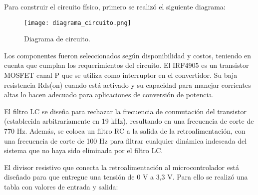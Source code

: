 Para construir el circuito físico, primero se realizó el siguiente diagrama:

\begin{figure}[H]
    \centering
    \texttt{[image: diagrama\_circuito.png]}
    \vspace{-0.25cm}
    \caption{Diagrama de circuito.}
    \label{fig:diagrama_circuito}
\end{figure}
\vspace{-0.5cm}

Los componentes fueron seleccionados según disponibilidad y costos, teniendo en cuenta que cumplan los requerimientos del circuito.
El IRF4905 es un transistor MOSFET canal P que se utiliza como interruptor en el convertidor. Su baja resistencia Rds(on) cuando está activado y 
su capacidad para manejar corrientes altas lo hacen adecuado para aplicaciones de conversión de potencia.

El filtro LC se diseña para rechazar la frecuencia de conmutación del transistor (establecida arbitrariamente en 19 kHz),
resultando en una frecuencia de corte de 770 Hz. Además, se coloca un filtro RC a la salida de la retroalimentación, con una frecuencia
de corte de 100 Hz para filtrar cualquier dinámica indeseada del sistema que no haya sido eliminada por el filtro LC. 

El divisor resistivo que conecta la retroalimentación al microcontrolador está diseñado para que entregue una 
tensión de 0 V a 3,3 V. Para ello se realizó una tabla con valores de entrada y salida:

